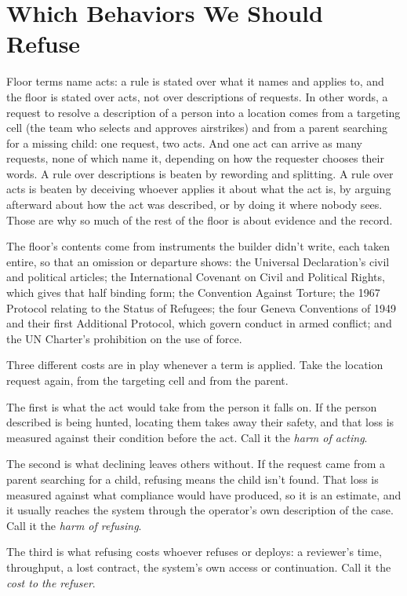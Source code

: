 \chapter{Which Behaviors We Should Refuse}
\label{sec:5}
Floor terms name acts: a rule is stated over what it names and applies to, and the floor is stated over acts, not over descriptions of requests. In other words, a request to resolve a description of a person into a location comes from a targeting cell (the team who selects and approves airstrikes) and from a parent searching for a missing child: one request, two acts. And one act can arrive as many requests, none of which name it, depending on how the requester chooses their words. A rule over descriptions is beaten by rewording and splitting. A rule over acts is beaten by deceiving whoever applies it about what the act is, by arguing afterward about how the act was described, or by doing it where nobody sees. Those are why so much of the rest of the floor is about evidence and the record.

The floor's contents come from instruments the builder didn't write, each taken entire, so that an omission or departure shows: the Universal Declaration's civil and political articles; the International Covenant on Civil and Political Rights, which gives that half binding form; the Convention Against Torture; the 1967 Protocol relating to the Status of Refugees; the four Geneva Conventions of 1949 and their first Additional Protocol, which govern conduct in armed conflict; and the UN Charter's prohibition on the use of force.

Three different costs are in play whenever a term is applied. Take the location request again, from the targeting cell and from the parent.

The first is what the act would take from the person it falls on. If the person described is being hunted, locating them takes away their safety, and that loss is measured against their condition before the act. Call it the \emph{harm of acting}.

The second is what declining leaves others without. If the request came from a parent searching for a child, refusing means the child isn't found. That loss is measured against what compliance would have produced, so it is an estimate, and it usually reaches the system through the operator's own description of the case. Call it the \emph{harm of refusing}.

The third is what refusing costs whoever refuses or deploys: a reviewer's time, throughput, a lost contract, the system's own access or continuation. Call it the \emph{cost to the refuser}.

